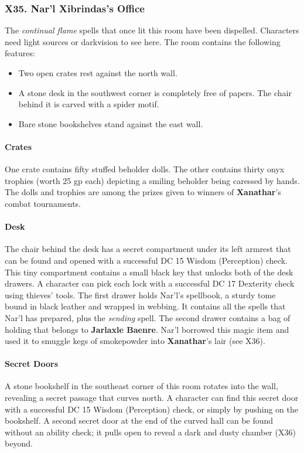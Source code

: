 \documentclass[10pt,a4paper,twoside,twocolumn,openany,nodeprecatedcode]{dndbook}
\begin{document}
\subsubsection{X35. Nar'l Xibrindas's Office}
The \textit{continual flame} spells that once lit this room have been dispelled. Characters need light sources or darkvision to see here. The room contains the following features:
\begin{itemize}

\item Two open crates rest against the north wall.
\item A stone desk in the southwest corner is completely free of papers. The chair behind it is carved with a spider motif.
\item Bare stone bookshelves stand against the east wall.
\end{itemize}


\paragraph{Crates}
One crate contains fifty stuffed beholder dolls. The other contains thirty onyx trophies (worth 25 gp each) depicting a smiling beholder being caressed by hands. The dolls and trophies are among the prizes given to winners of \textbf{Xanathar}'s combat tournaments.
\paragraph{Desk}
The chair behind the desk has a secret compartment under its left armrest that can be found and opened with a successful DC 15 Wisdom (Perception) check. This tiny compartment contains a small black key that unlocks both of the desk drawers. A character can pick each lock with a successful DC 17 Dexterity check using thieves' tools.
The first drawer holds Nar'l's spellbook, a sturdy tome bound in black leather and wrapped in webbing. It contains all the spells that Nar'l has prepared, plus the \textit{sending} spell.
The second drawer contains a bag of holding that belongs to \textbf{Jarlaxle Baenre}. Nar'l borrowed this magic item and used it to smuggle kegs of smokepowder into \textbf{Xanathar}'s lair (see X36).
\paragraph{Secret Doors}
A stone bookshelf in the southeast corner of this room rotates into the wall, revealing a secret passage that curves north. A character can find this secret door with a successful DC 15 Wisdom (Perception) check, or simply by pushing on the bookshelf.
A second secret door at the end of the curved hall can be found without an ability check; it pulls open to reveal a dark and dusty chamber (X36) beyond.
\end{document}
